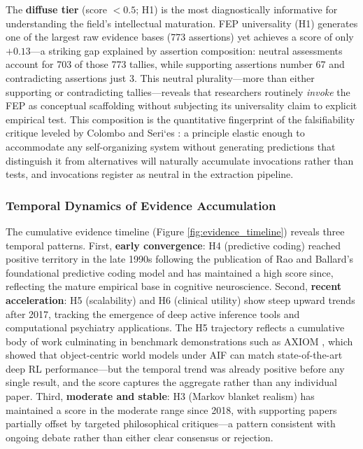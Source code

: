 \documentclass[
  english,
]{article}
\begin{document}
The \textbf{diffuse tier} (score \(< 0.5\); H1) is the most
diagnostically informative for understanding the field's intellectual
maturation. FEP universality (H1) generates one of the largest raw
evidence bases (773 assertions) yet achieves a score of only
\(+0.13\)---a striking gap explained by assertion composition: neutral
assessments account for 703 of those 773 tallies, while supporting
assertions number 67 and contradicting assertions just 3. This neutral
plurality---more than either supporting or contradicting
tallies---reveals that researchers routinely \textit{invoke} the FEP as
conceptual scaffolding without subjecting its universality claim to
explicit empirical test. This composition is the quantitative
fingerprint of the falsifiability critique leveled by Colombo and
Seri`es \citep{colombo2021free}: a principle elastic enough to
accommodate any self-organizing system without generating predictions
that distinguish it from alternatives will naturally accumulate
invocations rather than tests, and invocations register as neutral in
the extraction pipeline.

\subsubsection{Temporal Dynamics of Evidence
Accumulation}\label{temporal-dynamics-of-evidence-accumulation}

The cumulative evidence timeline (Figure \ref{fig:evidence_timeline})
reveals three temporal patterns. First, \textbf{early convergence}: H4
(predictive coding) reached positive territory in the late 1990s
following the publication of Rao and Ballard's foundational predictive
coding model \citep{rao1999predictive} and has maintained a high score
since, reflecting the mature empirical base in cognitive neuroscience.
Second, \textbf{recent acceleration}: H5 (scalability) and H6 (clinical
utility) show steep upward trends after 2017, tracking the emergence of
deep active inference tools and computational psychiatry applications.
The H5 trajectory reflects a cumulative body of work culminating in
benchmark demonstrations such as AXIOM \citep{heins2025axiom}, which
showed that object-centric world models under AIF can match
state-of-the-art deep RL performance---but the temporal trend was
already positive before any single result, and the score captures the
aggregate rather than any individual paper. Third, \textbf{moderate and
stable}: H3 (Markov blanket realism) has maintained a score in the
moderate range since 2018, with supporting papers partially offset by
targeted philosophical critiques---a pattern consistent with ongoing
debate rather than either clear consensus or rejection.
\end{document}
